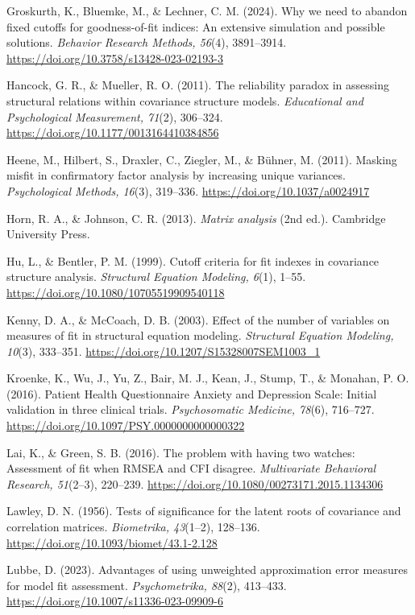 Groskurth, K., Bluemke, M., \& Lechner, C. M. (2024). Why we need to abandon fixed cutoffs for goodness-of-fit indices: An extensive simulation and possible solutions. \textit{Behavior Research Methods, 56}(4), 3891--3914. \url{https://doi.org/10.3758/s13428-023-02193-3}

Hancock, G. R., \& Mueller, R. O. (2011). The reliability paradox in assessing structural relations within covariance structure models. \textit{Educational and Psychological Measurement, 71}(2), 306--324. \url{https://doi.org/10.1177/0013164410384856}

Heene, M., Hilbert, S., Draxler, C., Ziegler, M., \& Bühner, M. (2011). Masking misfit in confirmatory factor analysis by increasing unique variances. \textit{Psychological Methods, 16}(3), 319--336. \url{https://doi.org/10.1037/a0024917}

Horn, R. A., \& Johnson, C. R. (2013). \textit{Matrix analysis} (2nd ed.). Cambridge University Press.

Hu, L., \& Bentler, P. M. (1999). Cutoff criteria for fit indexes in covariance structure analysis. \textit{Structural Equation Modeling, 6}(1), 1--55. \url{https://doi.org/10.1080/10705519909540118}

Kenny, D. A., \& McCoach, D. B. (2003). Effect of the number of variables on measures of fit in structural equation modeling. \textit{Structural Equation Modeling, 10}(3), 333--351. \url{https://doi.org/10.1207/S15328007SEM1003_1}

Kroenke, K., Wu, J., Yu, Z., Bair, M. J., Kean, J., Stump, T., \& Monahan, P. O. (2016). Patient Health Questionnaire Anxiety and Depression Scale: Initial validation in three clinical trials. \textit{Psychosomatic Medicine, 78}(6), 716--727. \url{https://doi.org/10.1097/PSY.0000000000000322}

Lai, K., \& Green, S. B. (2016). The problem with having two watches: Assessment of fit when RMSEA and CFI disagree. \textit{Multivariate Behavioral Research, 51}(2--3), 220--239. \url{https://doi.org/10.1080/00273171.2015.1134306}

Lawley, D. N. (1956). Tests of significance for the latent roots of covariance and correlation matrices. \textit{Biometrika, 43}(1--2), 128--136. \url{https://doi.org/10.1093/biomet/43.1-2.128}

Lubbe, D. (2023). Advantages of using unweighted approximation error measures for model fit assessment. \textit{Psychometrika, 88}(2), 413--433. \url{https://doi.org/10.1007/s11336-023-09909-6}

